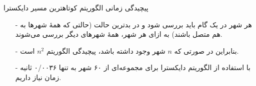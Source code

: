 \begin{frame}{پیچیدگی زمانی الگوریتم کوتاهترین مسیر دایکسترا}
\begin{itemize}\itmsep{5mm}
\item[-]
هر شهر در یک گام باید بررسی شود و در بدترین حالت (حالتی که همهٔ شهرها به هم متصل باشند) به ازای هر شهر، همهٔ شهرهای دیگر بررسی می‌شوند.
\item[-]
بنابراین در صورتی که $n$ شهر وجود داشته باشد، پیچیدگی الگوریتم
$n^2$
است.
\item[-]
با استفاده از الگوریتم دایکسترا برای مجموعه‌ای از ۶۰ شهر به تنها ۰/‌۰۰۳۶ ثانیه زمان نیاز داریم.
\end{itemize}
\end{frame}